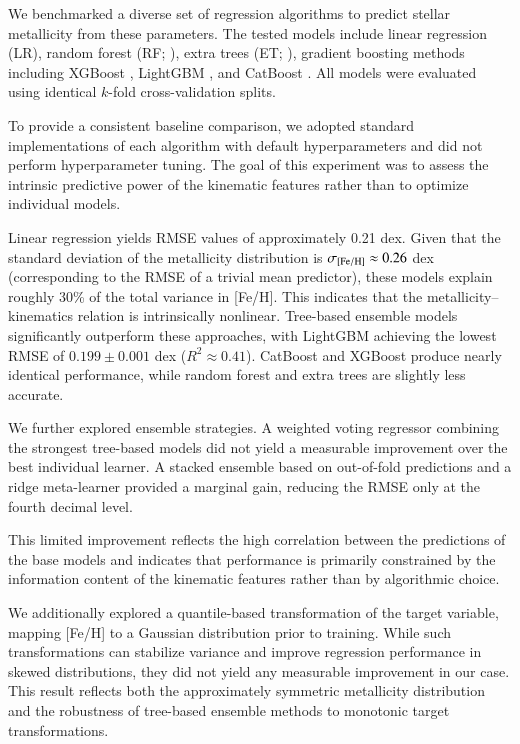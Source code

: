 \documentclass{aa}
\begin{document}
We benchmarked a diverse set of regression algorithms to predict stellar metallicity from these parameters. The tested models include linear regression (LR), random forest (RF; \citealt{breiman2001}), extra trees (ET; \citealt{geurts2006}), gradient boosting methods including XGBoost \citep{chen2016}, LightGBM \citep{ke2017}, and CatBoost \citep{prokhorenkova2018}. All models were evaluated using identical $k$-fold cross-validation splits.

To provide a consistent baseline comparison, we adopted standard implementations of each algorithm with default hyperparameters and did not perform hyperparameter tuning. The goal of this experiment was to assess the intrinsic predictive power of the kinematic features
rather than to optimize individual models.

Linear regression yields RMSE values of approximately 0.21 dex. Given that the standard deviation of the metallicity distribution is $\sigma_{\rm [Fe/H]} \approx 0.26$ dex (corresponding to the RMSE of a trivial mean predictor), these models explain roughly 30\% of the total variance in [Fe/H]. This indicates that the metallicity–kinematics relation is intrinsically nonlinear. Tree-based ensemble models significantly outperform these approaches, with LightGBM achieving the lowest RMSE of $0.199 \pm 0.001$ dex ($R^2 \approx 0.41$). CatBoost and XGBoost produce nearly identical performance, while random forest and extra trees are slightly less accurate.

We further explored ensemble strategies. A weighted voting regressor combining the strongest tree-based models did not yield a measurable improvement over the best individual learner. A stacked ensemble based on out-of-fold predictions and a ridge meta-learner provided a marginal gain, reducing the RMSE only at the fourth decimal level.

This limited improvement reflects the high correlation between the predictions of the base models and indicates that performance is primarily constrained by the information content of the kinematic features rather than by algorithmic choice.

We additionally explored a quantile-based transformation of the target variable, mapping [Fe/H] to a Gaussian distribution prior to training. While such transformations can stabilize variance and improve regression performance in skewed distributions, they did not yield any measurable improvement in our case. This result reflects both the approximately symmetric metallicity distribution
and the robustness of tree-based ensemble methods to monotonic target transformations.
\end{document}

